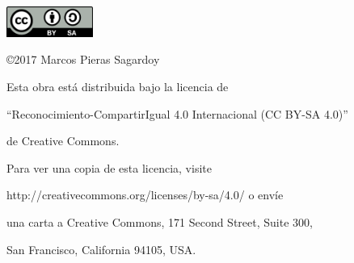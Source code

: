 \begin{flushright}

\includegraphics[height=1.0cm]{figures/CC-BY-SA.png}

\vspace*{0.5cm}

\copyright 2017 Marcos Pieras Sagardoy

\vspace*{0.3cm}

Esta obra está distribuida bajo la licencia de 

``Reconocimiento-CompartirIgual 4.0 Internacional (CC BY-SA 4.0)''

de Creative Commons.

\vspace{0.2cm}

Para ver una copia de esta licencia, visite

http://creativecommons.org/licenses/by-sa/4.0/ o envíe

una carta a Creative Commons, 171 Second Street, Suite 300,

San Francisco, California 94105, USA.

\end{flushright}